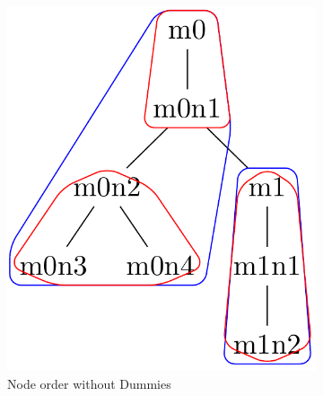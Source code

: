 \documentclass{article}
\begin{document}
\begin{figure}[ht]
	\begin{subfigure}{3cm}
		\includegraphics[scale=0.2]{F3C1Tree}
		\caption{Node order without Dummies}
		\label{factory:subim1}
	\end{subfigure}
	\begin{subfigure}{3cm}

\end{subfigure}
\end{figure}
\end{document}
